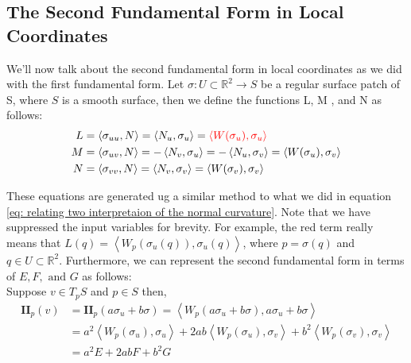 \documentclass{article}
\theoremstyle{plain}
\theoremstyle{definition}
\theoremstyle{remark}
\newcommand{\R}{\mathbb{R}}
\begin{document}
\subsection{The Second Fundamental Form in Local Coordinates}
We'll now talk about the second fundamental form in local coordinates as we did with the first fundamental form. Let \( \sigma: U \subset \R^2 \rightarrow S\) be a regular surface patch of S, where \(S\) is a smooth surface, then we define the functions L, M , and N as follows:
\begin{align} \label{eq: define second fundamental form in local coordinates}
    \begin{split}
        L & = \left\langle \sigma_{uu}, N\right\rangle = \left\langle N_u, \sigma_u\right\rangle = { \color{red}\left\langle W(\sigma_u), \sigma_u\right\rangle} \\
        M & = \left\langle \sigma_{uv}, N\right\rangle = - \left\langle N_v, \sigma_u\right\rangle = - \left\langle N_u, \sigma_v\right\rangle  = \left\langle W(\sigma_u), \sigma_v\right\rangle \\
        N & = \left\langle \sigma_{vv}, N\right\rangle = \left\langle N_v, \sigma_v\right\rangle = \left\langle W(\sigma_v), \sigma_v\right\rangle
    \end{split}
\end{align}

These equations are generated ug a similar method to what we did in equation \ref{eq: relating two interpretaion of the normal curvature}. Note that we have suppressed the input variables for brevity. For example, the red term really means that \( L(q) = \left\langle W_{p}(\sigma_u(q)), \sigma_u(q)\right\rangle \), where \(p = \sigma(q)\) and \(q \in U \subset \R^2\). Furthermore, we can represent the second fundamental form in terms of \(E, F, \text{ and } G\) as follows:\\
Suppose \( v \in T_pS\) and \( p \in S\) then,
\begin{align*}
    \mathbf{II}_p(v) & = \mathbf{II}_p(a\sigma_u + b\sigma) = \left\langle W_p(a\sigma_u + b\sigma), a\sigma_u + b\sigma \right\rangle                                                        \\
                     & = a^2 \left\langle W_p(\sigma_u), \sigma_u\right\rangle + 2ab\left\langle W_p(\sigma_u), \sigma_v\right\rangle + b^2\left\langle W_p(\sigma_v), \sigma_v \right\rangle \\
                     & = a^2 E + 2ab F + b^2 G
\end{align*}
\end{document}
